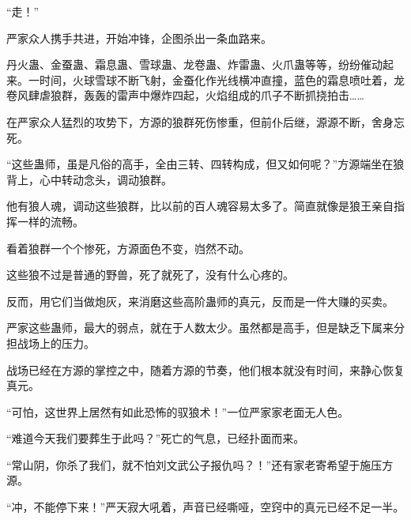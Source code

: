 \begin{this_body}
“走！”

严家众人携手共进，开始冲锋，企图杀出一条血路来。

丹火蛊、金蚕蛊、霜息蛊、雪球蛊、龙卷蛊、炸雷蛊、火爪蛊等等，纷纷催动起来。一时间，火球雪球不断飞射，金蚕化作光线横冲直撞，蓝色的霜息喷吐着，龙卷风肆虐狼群，轰轰的雷声中爆炸四起，火焰组成的爪子不断抓挠拍击……

在严家众人猛烈的攻势下，方源的狼群死伤惨重，但前仆后继，源源不断，舍身忘死。

“这些蛊师，虽是凡俗的高手，全由三转、四转构成，但又如何呢？”方源端坐在狼背上，心中转动念头，调动狼群。

他有狼人魂，调动这些狼群，比以前的百人魂容易太多了。简直就像是狼王亲自指挥一样的流畅。

看着狼群一个个惨死，方源面色不变，岿然不动。

这些狼不过是普通的野兽，死了就死了，没有什么心疼的。

反而，用它们当做炮灰，来消磨这些高阶蛊师的真元，反而是一件大赚的买卖。

严家这些蛊师，最大的弱点，就在于人数太少。虽然都是高手，但是缺乏下属来分担战场上的压力。

战场已经在方源的掌控之中，随着方源的节奏，他们根本就没有时间，来静心恢复真元。

“可怕，这世界上居然有如此恐怖的驭狼术！”一位严家家老面无人色。

“难道今天我们要葬生于此吗？”死亡的气息，已经扑面而来。

“常山阴，你杀了我们，就不怕刘文武公子报仇吗？！”还有家老寄希望于施压方源。

“冲，不能停下来！”严天寂大吼着，声音已经嘶哑，空窍中的真元已经不足一半。

\end{this_body}


